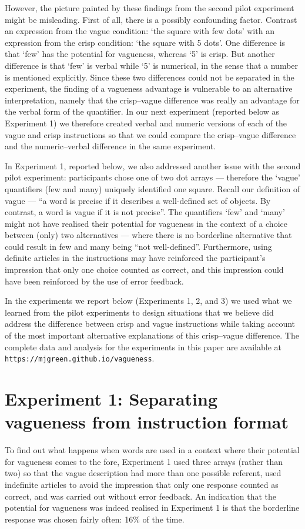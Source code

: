 \documentclass[ %
  graybox       %
 ,envcountchap  %
 ,sectrefs      %
]{svmono}
\begin{document}
However, the picture painted by these findings from the second pilot experiment might be misleading. First of all, there is a possibly confounding factor. Contrast an expression from the vague condition: `the square with few dots' with an expression from the crisp condition: `the square with 5 dots'. One difference is that `few' has the potential for vagueness, whereas `5' is crisp. But another difference is that `few' is verbal while `5' is numerical, in the sense that a number is mentioned explicitly. Since these two differences could not be separated in the experiment, the finding of a vagueness advantage is vulnerable to an alternative interpretation, namely that the crisp--vague difference was really an advantage for the verbal form of the quantifier. In our next experiment (reported below as Experiment 1) we therefore created verbal and numeric versions of each of the vague and crisp instructions so that we could compare the crisp--vague difference and the numeric--verbal difference in the same experiment.

In Experiment 1, reported below, we also addressed another issue with the second pilot experiment: participants chose one of two dot arrays --- therefore the `vague' quantifiers (few and many) uniquely identified one square. Recall our definition of vague --- ``a word is precise if it describes a well-defined set of objects. By contrast, a word is vague if it is not precise''. The quantifiers `few' and `many' might not have realised their potential for vagueness in the context of a choice between (only) two alternatives --- where there is no borderline alternative that could result in few and many being ``not well-defined''. Furthermore, using definite articles in the instructions may have reinforced the participant's impression that only one choice counted as correct, and this impression could have been reinforced by the use of error feedback.

In the experiments we report below (Experiments 1, 2, and 3) we used what we learned from the pilot experiments to design situations that we believe did address the difference between crisp and vague instructions while taking account of the most important alternative explanations of this crisp--vague difference. The complete data and analysis for the experiments in this paper are available at \texttt{https://mjgreen.github.io/vagueness}.

\section{Experiment 1: Separating vagueness from instruction format}
To find out what happens when words are used in a context where their potential for vagueness comes to the fore, Experiment 1 used three arrays (rather than two) so that the vague description had more than one possible referent, used indefinite articles to avoid the impression that only one response counted as correct, and was carried out without error feedback. An indication that the potential for vagueness was indeed realised in Experiment 1 is that the borderline response was chosen fairly often: 16\% of the time.
\end{document}
